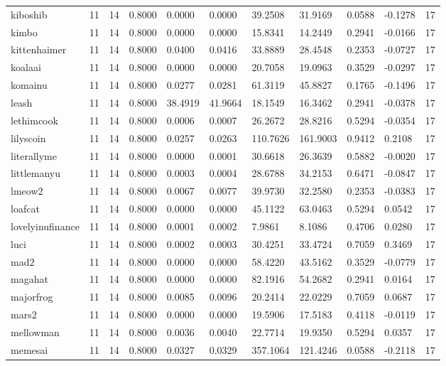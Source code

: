 \begin{table}[htbp]
\begin{tabular}{lllllllllll}
kiboshib & 11 & 14 & 0.8000 & 0.0000 & 0.0000 & 39.2508 & 31.9169 & 0.0588 & -0.1278 & 17 \\
kimbo & 11 & 14 & 0.8000 & 0.0000 & 0.0000 & 15.8341 & 14.2449 & 0.2941 & -0.0166 & 17 \\
kittenhaimer & 11 & 14 & 0.8000 & 0.0400 & 0.0416 & 33.8889 & 28.4548 & 0.2353 & -0.0727 & 17 \\
koalaai & 11 & 14 & 0.8000 & 0.0000 & 0.0000 & 20.7058 & 19.0963 & 0.3529 & -0.0297 & 17 \\
komainu & 11 & 14 & 0.8000 & 0.0277 & 0.0281 & 61.3119 & 45.8827 & 0.1765 & -0.1496 & 17 \\
leash & 11 & 14 & 0.8000 & 38.4919 & 41.9664 & 18.1549 & 16.3462 & 0.2941 & -0.0378 & 17 \\
lethimcook & 11 & 14 & 0.8000 & 0.0006 & 0.0007 & 26.2672 & 28.8216 & 0.5294 & -0.0354 & 17 \\
lilyscoin & 11 & 14 & 0.8000 & 0.0257 & 0.0263 & 110.7626 & 161.9003 & 0.9412 & 0.2108 & 17 \\
literallyme & 11 & 14 & 0.8000 & 0.0000 & 0.0001 & 30.6618 & 26.3639 & 0.5882 & -0.0020 & 17 \\
littlemanyu & 11 & 14 & 0.8000 & 0.0003 & 0.0004 & 28.6788 & 34.2153 & 0.6471 & -0.0847 & 17 \\
lmeow2 & 11 & 14 & 0.8000 & 0.0067 & 0.0077 & 39.9730 & 32.2580 & 0.2353 & -0.0383 & 17 \\
loafcat & 11 & 14 & 0.8000 & 0.0000 & 0.0000 & 45.1122 & 63.0463 & 0.5294 & 0.0542 & 17 \\
lovelyinufinance & 11 & 14 & 0.8000 & 0.0001 & 0.0002 & 7.9861 & 8.1086 & 0.4706 & 0.0280 & 17 \\
luci & 11 & 14 & 0.8000 & 0.0002 & 0.0003 & 30.4251 & 33.4724 & 0.7059 & 0.3469 & 17 \\
mad2 & 11 & 14 & 0.8000 & 0.0000 & 0.0000 & 58.4220 & 43.5162 & 0.3529 & -0.0779 & 17 \\
magahat & 11 & 14 & 0.8000 & 0.0000 & 0.0000 & 82.1916 & 54.2682 & 0.2941 & 0.0164 & 17 \\
majorfrog & 11 & 14 & 0.8000 & 0.0085 & 0.0096 & 20.2414 & 22.0229 & 0.7059 & 0.0687 & 17 \\
mars2 & 11 & 14 & 0.8000 & 0.0000 & 0.0000 & 19.5906 & 17.5183 & 0.4118 & -0.0119 & 17 \\
mellowman & 11 & 14 & 0.8000 & 0.0036 & 0.0040 & 22.7714 & 19.9350 & 0.5294 & 0.0357 & 17 \\
memesai & 11 & 14 & 0.8000 & 0.0327 & 0.0329 & 357.1064 & 121.4246 & 0.0588 & -0.2118 & 17 \\

\end{tabular}
\end{table}
